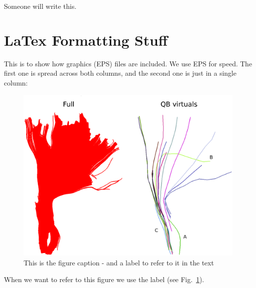 \documentclass{bioinfo}
\begin{document}
Someone will write this.

\section{LaTex Formatting Stuff}

This is to show how graphics (EPS) files are included. We use EPS for
speed. The first one is spread across both columns, and the second one
is just in a single column:

\begin{figure}
\centerline{\includegraphics[width=160mm]{Figures/Fig_4_cst_simplification_relabeled_triple.eps}}
\caption{This is the figure caption - and a label to refer to it in the text \label{Fig:big_picture}}
\end{figure}

When we want to refer to this figure we use the label (see
Fig.~\ref{Fig:big_picture}).
\end{document}
